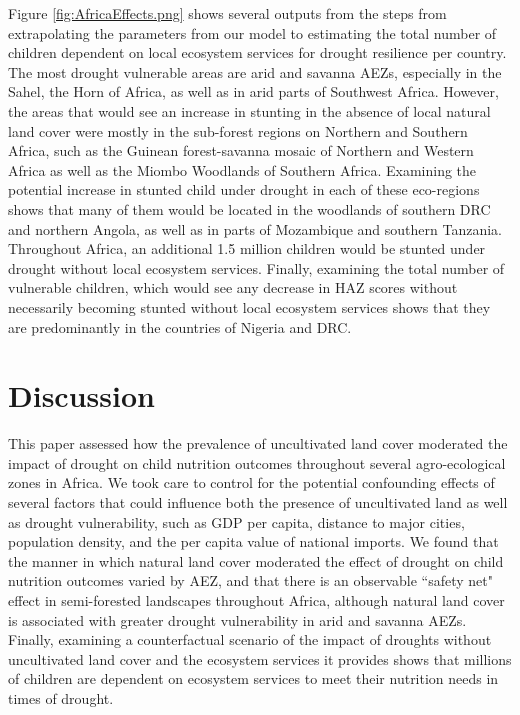 \documentclass{article}
\begin{document}
Figure \ref{fig:AfricaEffects.png} shows several outputs from the steps from extrapolating the parameters from our model to estimating the total number of children dependent on local ecosystem services for drought resilience per country.  The most drought vulnerable areas are arid and savanna AEZs, especially in the Sahel, the Horn of Africa, as well as in arid parts of Southwest Africa.  However, the areas that would see an increase in stunting in the absence of local natural land cover were mostly in the sub-forest regions on Northern and Southern Africa, such as the Guinean forest-savanna mosaic of Northern and Western Africa as well as the Miombo Woodlands of Southern Africa. Examining the potential increase in stunted child under drought in each of these eco-regions shows that many of them would be located in the woodlands of southern DRC and northern Angola, as well as in parts of Mozambique and southern Tanzania.  Throughout Africa, an additional 1.5 million children would be stunted under drought without local ecosystem services.  Finally, examining the total number of vulnerable children, which would see any decrease in HAZ scores without necessarily becoming stunted without local ecosystem services shows that they are predominantly in the countries of Nigeria and DRC.

\section{Discussion}

This paper assessed how the prevalence of uncultivated land cover moderated the impact of drought on child nutrition outcomes throughout several agro-ecological zones in Africa.  We took care to control for the potential confounding effects of several factors that could influence both the presence of uncultivated land as well as drought vulnerability, such as GDP per capita, distance to major cities, population density, and the per capita value of national imports.  We found that the manner in which natural land cover moderated the effect of drought on child nutrition outcomes varied by AEZ, and that there is an observable ``safety net" effect in semi-forested landscapes throughout Africa, although natural land cover is associated with greater drought vulnerability in arid and savanna AEZs.  Finally, examining a counterfactual scenario of the impact of droughts without uncultivated land cover and the ecosystem services it provides shows that millions of children are dependent on ecosystem services to meet their nutrition needs in times of drought.
\end{document}
